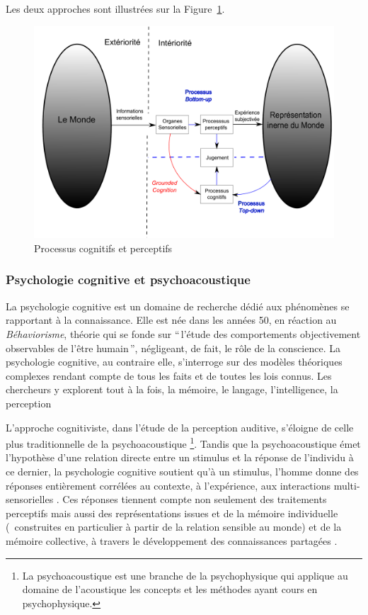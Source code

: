 Les deux approches sont illustrées sur la Figure~\ref{fig:processusPercepAndCo}.

\begin{figure}[bth]
        \myfloatalign
        \includegraphics[width=\linewidth]{gfx/Representation}
        \caption{Processus cognitifs et perceptifs}\label{fig:processusPercepAndCo}
\end{figure}

\subsubsection{Psychologie cognitive et psychoacoustique}

La psychologie cognitive est un domaine de recherche dédié aux phénomènes se rapportant à la connaissance. Elle est née dans les années 50, en réaction au \emph{Béhaviorisme}, théorie qui se fonde sur ``\,l'étude des comportements objectivement observables de l'être humain\,'', négligeant, de fait, le rôle de la conscience. La psychologie cognitive, au contraire elle, s'interroge sur des modèles théoriques complexes rendant compte de tous les faits et de toutes les lois connus. Les chercheurs y explorent tout à la fois, la mémoire, le langage, l'intelligence, la perception

L'approche cognitiviste, dans l'étude de la perception auditive, s'éloigne de celle plus traditionnelle de la psychoacoustique \footnote{La psychoacoustique est une branche de la psychophysique qui applique au domaine de l'acoustique les concepts et les méthodes ayant cours en psychophysique.}. Tandis que la psychoacoustique émet l'hypothèse d'une relation directe entre un stimulus et la réponse de l'individu à ce dernier, la psychologie cognitive soutient qu'à un stimulus, l'homme donne des réponses entièrement corrélées au contexte, à l'expérience, aux interactions multi-sensorielles \citep{maffiolo_marieParis_1997}. Ces réponses tiennent compte non seulement des traitements perceptifs mais aussi des représentations issues et de la mémoire individuelle (\ie~construites en particulier à partir de la relation sensible au monde) et de la mémoire collective, à travers le développement des connaissances partagées \citep[p. ??]{maffiolo_caracterisation_1999}.

